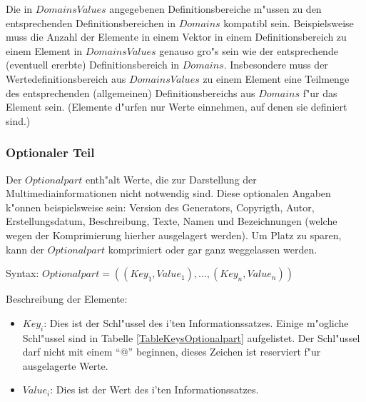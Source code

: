 Die in $DomainsValues$ angegebenen Definitionsbereiche m"ussen zu den entsprechenden Definitionsbereichen in $Domains$ kompatibl sein. Beispielsweise muss die Anzahl der Elemente in einem Vektor in einem Definitionsbereich zu einem Element in $DomainsValues$ genauso gro"s sein wie der entsprechende (eventuell ererbte) Definitionsbereich in $Domains$.
Insbesondere muss der Wertedefinitionsbereich aus $DomainsValues$ zu einem Element eine Teilmenge des entsprechenden (allgemeinen) Definitionsbereichs aus $Domains$ f"ur das Element sein. (Elemente d"urfen nur Werte einnehmen, auf denen sie definiert sind.)



\subsubsection{Optionaler Teil}
\label{root_multimediainfo_opt}

Der $Optionalpart$ enth"alt Werte, die zur Darstellung der Multimediainformationen nicht notwendig sind.
Diese optionalen Angaben k"onnen beispielsweise sein: Version des Generators, Copyrigth, Autor, Erstellungsdatum, Beschreibung, Texte, Namen und Bezeichnungen (welche wegen der Komprimierung hierher ausgelagert werden).
Um Platz zu sparen, kann der $Optionalpart$ komprimiert oder gar ganz weggelassen werden.

\bigskip\noindent
Syntax:
$Optionalpart=( (Key_1, Value_1), \ldots, (Key_n, Value_n))$

\bigskip\noindent
Beschreibung der Elemente:
\begin{itemize}
 \item $Key_i$: Dies ist der Schl"ussel des i'ten Informationssatzes. Einige m"ogliche Schl"ussel sind in Tabelle \ref{TableKeysOptionalpart} aufgelistet. Der Schl"ussel darf nicht mit einem ``@'' beginnen, dieses Zeichen ist reserviert f"ur ausgelagerte Werte.
 \item $Value_i$: Dies ist der Wert des i'ten Informationssatzes.
\end{itemize}


